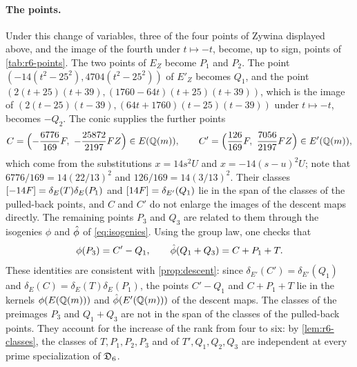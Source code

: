 \paragraph{The points.} Under this change of variables, three of the four points of Zywina displayed above, and the image of the fourth under $t\mapsto-t$, become, up to sign, points of \cref{tab:r6-points}. The two points of $E_Z$ become $P_1$ and $P_2$. The point $(-14(t^2-25^2),4704(t^2-25^2))$ of $E'_Z$ becomes $Q_1$, and the point $(2(t+25)(t+39),(1760-64t)(t+25)(t+39))$, which is the image of $(2(t-25)(t-39),(64t+1760)(t-25)(t-39))$ under $t\mapsto-t$, becomes $-Q_2$. The conic supplies the further points
\[
C=\Bigl(-\frac{6776}{169}F,\ -\frac{25872}{2197}FZ\Bigr)\in E(\Q(m)),\qquad C'=\Bigl(\frac{126}{169}F,\ \frac{7056}{2197}FZ\Bigr)\in E'(\Q(m)),
\]
which come from the substitutions $x=14s^2U$ and $x=-14(s-u)^2U$; note that $6776/169=14(22/13)^2$ and $126/169=14(3/13)^2$. Their classes $[-14F]=\delta_E(T)\delta_E(P_1)$ and $[14F]=\delta_{E'}(Q_1)$ lie in the span of the classes of the pulled-back points, and $C$ and $C'$ do not enlarge the images of the descent maps directly. The remaining points $P_3$ and $Q_3$ are related to them through the isogenies $\phi$ and $\hat\phi$ of \eqref{eq:isogenies}. Using the group law, one checks that
\begin{equation}\label{r6o:halving}
\phi(P_3)=C'-Q_1,\qquad \hat\phi(Q_1+Q_3)=C+P_1+T.
\end{equation}
These identities are consistent with \cref{prop:descent}: since $\delta_{E'}(C')=\delta_{E'}(Q_1)$ and $\delta_E(C)=\delta_E(T)\delta_E(P_1)$, the points $C'-Q_1$ and $C+P_1+T$ lie in the kernels $\phi(E(\mathbb Q(m)))$ and $\hat\phi(E'(\mathbb Q(m)))$ of the descent maps. The classes of the preimages $P_3$ and $Q_1+Q_3$ are not in the span of the classes of the pulled-back points. They account for the increase of the rank from four to six: by \cref{lem:r6-classes}, the classes of $T,P_1,P_2,P_3$ and of $T',Q_1,Q_2,Q_3$ are independent at every prime specialization of $\mathfrak D_6$.
